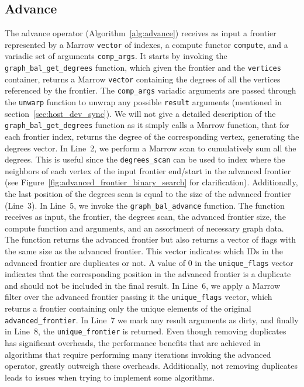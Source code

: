 


\subsection{Advance}
\label{sec:advance_operator}



The advance operator (Algorithm~\ref{alg:advance}) receives as input a frontier represented by a Marrow \texttt{vector} of indexes, a compute functor \texttt{compute}, and a variadic set of arguments \texttt{comp\_args}. It starts by invoking the \texttt{graph\_bal\_get\_degrees} function, which given the frontier and the \texttt{vertices} container, returns a Marrow \texttt{vector} containing the degrees of all the vertices referenced by the frontier. The \texttt{comp\_args} variadic arguments are passed through the \texttt{unwarp} function to unwrap any possible \texttt{result} arguments (mentioned in section~\ref{sec:host_dev_sync}). We will not give a detailed description of the \texttt{graph\_bal\_get\_degrees} function as it simply calls a Marrow function, that for each frontier index, returns the degree of the corresponding vertex, generating the degrees vector. In Line~2, we perform a Marrow scan to cumulatively sum all the degrees. This is useful since the \texttt{degrees\_scan} can be used to index where the neighbors of each vertex of the input frontier end/start in the advanced frontier (see Figure~\ref{fig:advanced_frontier_binary_search} for clarification). Additionally, the last position of the degrees scan is equal to the size of the advanced frontier (Line~3). In Line~5, we invoke the \texttt{graph\_bal\_advance} function. The function receives as input, the frontier, the degrees scan, the advanced frontier size, the compute function and arguments, and an assortment of necessary graph data. The function returns the advanced frontier but also returns a vector of flags with the same size as the advanced frontier. This vector indicates which IDs in the advanced frontier are duplicates or not. A value of $0$ in the \texttt{unique\_flags} vector indicates that the corresponding position in the advanced frontier is a duplicate and should not be included in the final result. In Line~6, we apply a Marrow filter over the advanced frontier passing it the \texttt{unique\_flags} vector, which returns a frontier containing only the unique elements of the original \texttt{advanced\_frontier}. In Line~7  we mark any result arguments as dirty, and finally in Line~8, the \texttt{unique\_frontier} is returned. Even though removing duplicates has significant overheads, the performance benefits that are achieved in algorithms that require performing many iterations invoking the advanced operator, greatly outweigh these overheads. Additionally, not removing duplicates leads to issues when trying to implement some algorithms. 


